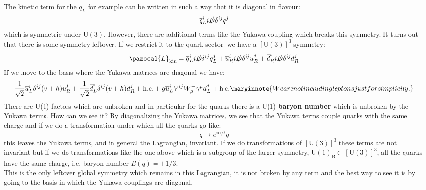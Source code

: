 \documentclass[../main.tex]{subfiles}
\begin{document}
The kinetic term for the $q_L$ for example can be written in such a way that it is diagonal in flavour:
\[
\overline{q}_L^ii\slashed{D}\delta^{ij}q^j
\]
which is symmetric under $\text{U}(3)$. However, there are additional terms like the Yukawa coupling which breaks this symmetry. It turns out that there is some symmetry leftover. If we restrict it to the quark sector, we have a $[\text{U}(3)]^3$ symmetry:
\[
\pazocal{L}_{\text{kin}}=\overline{q}_L^ii\slashed{D}\delta^{ij}q_L^j+\overline{u}_R^ii\slashed{D}\delta^{ij}u_R^j+\overline{d}_R^ii\slashed{D}\delta^{ij}d_R^j
\]
If we move to the basis where the Yukawa matrices are diagonal we have:
\[
\frac{1}{\sqrt{2}}\overline{u}_L^i\delta^{ij}(v+h)u_R^j+\frac{1}{\sqrt{2}}\overline{d}_L^i\delta^{ij}(v+h)d_R^j+\text{h.c.}+g\overline{u}_L^iV^{ij}W_\mu^-\gamma^\mu d_L^j+\text{h.c.}\marginnote{We are not including leptons just for simplicity.}
\]
There are U(1) factors which are unbroken and in particular for the quarks there is a U(1) \textbf{baryon number} which is unbroken by the Yukawa terms. How can we see it? By diagonalizing the Yukawa matrices, we see that the Yukawa terms couple quarks with the same charge and if we do a transformation under which all the quarks go like:
\[
q\to e^{i\alpha/3}q
\]
this leaves the Yukawa terms, and in general the Lagrangian, invariant. If we do transformations of $[\text{U}(3)]^3$ these terms are not invariant but if we do transformations like the one above which is a subgroup of the larger symmetry,  U$(1)_{\text{B}}\subset[\text{U}(3)]^3$, all the quarks have the same charge, i.e. baryon number $B(q)=+1/3$.\\
This is the only leftover global symmetry which remains in this Lagrangian, it is not broken by any term and the best way to see it is by going to the basis in which the Yukawa couplings are diagonal.
\end{document}
